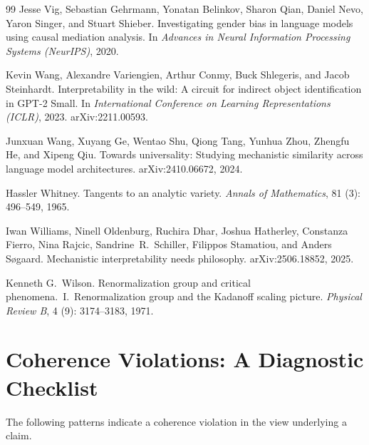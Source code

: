 \documentclass{article}
\begin{document}
\begin{thebibliography}{99}
Jesse Vig, Sebastian Gehrmann, Yonatan Belinkov, Sharon Qian, Daniel Nevo,
  Yaron Singer, and Stuart Shieber.
\newblock Investigating gender bias in language models using causal mediation
  analysis.
\newblock In \emph{Advances in Neural Information Processing Systems (NeurIPS)}, 2020.

Kevin Wang, Alexandre Variengien, Arthur Conmy, Buck Shlegeris, and Jacob
  Steinhardt.
\newblock Interpretability in the wild: A circuit for indirect object
  identification in {GPT-2 Small}.
\newblock In \emph{International Conference on Learning Representations
  (ICLR)}, 2023.
\newblock arXiv:2211.00593.

Junxuan Wang, Xuyang Ge, Wentao Shu, Qiong Tang, Yunhua Zhou, Zhengfu He, and
  Xipeng Qiu.
\newblock Towards universality: Studying mechanistic similarity across language
  model architectures.
\newblock arXiv:2410.06672, 2024.

Hassler Whitney.
\newblock Tangents to an analytic variety.
\newblock \emph{Annals of Mathematics}, 81 (3): 496--549, 1965.

Iwan Williams, Ninell Oldenburg, Ruchira Dhar, Joshua Hatherley, Constanza
  Fierro, Nina Rajcic, Sandrine~R.\ Schiller, Filippos Stamatiou, and Anders
  S{\o}gaard.
\newblock Mechanistic interpretability needs philosophy.
\newblock arXiv:2506.18852, 2025.

Kenneth G.\ Wilson.
\newblock Renormalization group and critical phenomena.\ {I}.\ Renormalization
  group and the {Kadanoff} scaling picture.
\newblock \emph{Physical Review B}, 4 (9): 3174--3183, 1971.

\end{thebibliography}

\newpage
\appendix
\section{Coherence Violations: A Diagnostic Checklist}\label{app:checklist}

The following patterns indicate a coherence violation in the view
underlying a claim.
\end{document}
